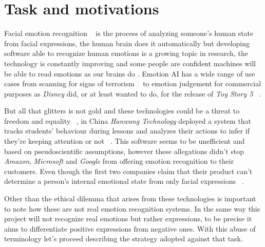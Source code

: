 \section{Task and motivations}
Facial emotion recognition ~\cite{blog:facial_recognition} is the process of analyzing someone's human state from facial expressions, the human brain does it automatically but developing software able to recognize human emotions is a growing topic in research, the technology is constantly improving and some people are confident machines will be able to read emotions as our brains do .
Emotion AI has a wide range of use cases from scanning for signs of terrorism ~\cite{blog:terrorism} to emotion judgement for commercial purposes as \textit{Disney} did, or at least wanted to do, for the release of \textit{Toy Story 5} ~\cite{blog:disney}.

But all that glitters is not gold and these technologies could be a threat to freedom and equality ~\cite{blog:china1}, in China \textit{Hanwang Technology} deployed a system that tracks students' behaviour during lessons and analyzes their actions to infer if they're keeping attention or not ~\cite{blog:china3}.
This software seems to be unefficient and based on pseudoscientific assumptions, however these allegations didn't stop \textit{Amazon}, \textit{Microsoft} and \textit{Google} from offering emotion recognition to their customers. 
Even though the first two companies claim that their product can't determine a person's internal emotional state from only facial expressions ~\cite{blog:china2}. 

Other than the ethical dilemma that arises from these technologies is important to note how these are not real emotion recognition systems.
In the same way this project will not recognize real emotions but rather expressions, to be precise it aims to differentiate positive expressions from negative ones.
With this abuse of terminology let's proceed describing the strategy adopted against that task.